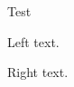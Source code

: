 \documentclass{beamer}
\begin{document}
\begin{frame}{Test}

\begin{minipage}{\textwidth}
\begin{pairs}
\begin{Leftside} 

\beginnumbering
\pstart
Left text.
\pend
\endnumbering
\end{Leftside}

\begin{Rightside}
\beginnumbering
\pstart
Right text.
\pend
\endnumbering
\end{Rightside}
\end{pairs}
\Columns
\end{minipage}

\end{frame}
\end{document}
